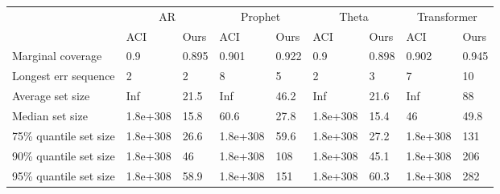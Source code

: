 \begin{tabular}{lllllllll}
\toprule
& \multicolumn{2}{c}{AR}& \multicolumn{2}{c}{Prophet}& \multicolumn{2}{c}{Theta}& \multicolumn{2}{c}{Transformer} \\
& ACI & Ours & ACI & Ours & ACI & Ours & ACI & Ours \\
\midrule
Marginal coverage & 0.9 & 0.895 & 0.901 & 0.922 & 0.9 & 0.898 & 0.902 & 0.945 \\
Longest err sequence & 2 & 2 & 8 & 5 & 2 & 3 & 7 & 10 \\
Average set size & Inf & 21.5 & Inf & 46.2 & Inf & 21.6 & Inf & 88 \\
Median set size & 1.8e+308 & 15.8 & 60.6 & 27.8 & 1.8e+308 & 15.4 & 46 & 49.8 \\
75\% quantile set size & 1.8e+308 & 26.6 & 1.8e+308 & 59.6 & 1.8e+308 & 27.2 & 1.8e+308 & 131 \\
90\% quantile set size & 1.8e+308 & 46 & 1.8e+308 & 108 & 1.8e+308 & 45.1 & 1.8e+308 & 206 \\
95\% quantile set size & 1.8e+308 & 58.9 & 1.8e+308 & 151 & 1.8e+308 & 60.3 & 1.8e+308 & 282 \\
\bottomrule
\end{tabular}
